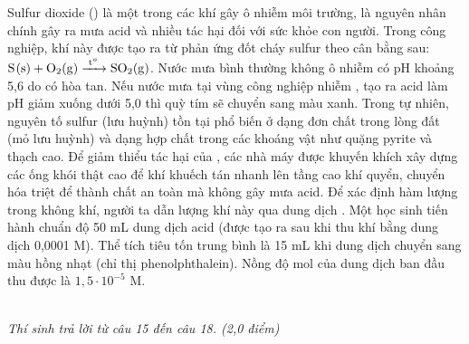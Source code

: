 \documentclass[11pt,a4paper]{article}
\begin{document}
\begin{ex}
Sulfur dioxide () là một trong các khí gây ô nhiễm môi trường, là nguyên nhân chính gây ra mưa acid và nhiều tác hại đối với sức khỏe con người. Trong công nghiệp, khí này được tạo ra từ phản ứng đốt cháy sulfur theo cân bằng sau: $\ce{S(s) + O2(g) ->[t^o] SO2(g)}$.
\choiceTF
Nước mưa bình thường không ô nhiễm có pH khoảng 5,6 do có  hòa tan. Nếu nước mưa tại vùng công nghiệp nhiễm , tạo ra acid  làm pH giảm xuống dưới 5,0 thì quỳ tím sẽ chuyển sang màu xanh.
\True Trong tự nhiên, nguyên tố sulfur (lưu huỳnh) tồn tại phổ biến ở dạng đơn chất trong lòng đất (mỏ lưu huỳnh) và dạng hợp chất trong các khoáng vật như quặng pyrite và thạch cao.
Để giảm thiểu tác hại của , các nhà máy được khuyến khích xây dựng các ống khói thật cao để khí  khuếch tán nhanh lên tầng cao khí quyển, chuyển hóa triệt để thành chất an toàn mà không gây mưa acid.
\True Để xác định hàm lượng  trong không khí, người ta dẫn lượng khí này qua dung dịch . Một học sinh tiến hành chuẩn độ 50 mL dung dịch acid  (được tạo ra sau khi thu khí  bằng dung dịch  0,0001 M). Thể tích  tiêu tốn trung bình là 15 mL khi dung dịch chuyển sang màu hồng nhạt (chỉ thị phenolphthalein). Nồng độ mol của dung dịch  ban đầu thu được là $1{,}5\cdot 10^{-5}\text{ M}$.
\end{ex}

\vspace{6pt}
 \\
\textit{Thí sinh trả lời từ câu 15 đến câu 18. (2,0 điểm)}
\vspace{4pt}
\end{document}
